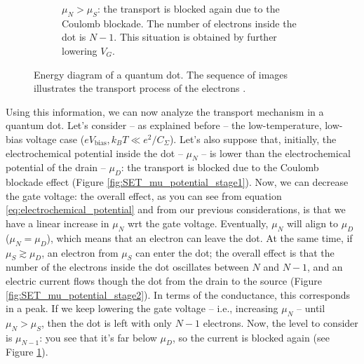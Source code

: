 \documentclass[a4paper,twoside,11pt]{book}
\begin{document}
\begin{figure}
\begin{subfigure}[t]{0.45\textwidth}
		\caption{$\mu_N>\mu_S$: the transport is blocked again due to the Coulomb blockade. The number of electrons inside the dot is $N-1$. This situation is obtained by further lowering $V_G$.}
		\label{fig:SET_mu_potential_stage3}
		\end{subfigure}
	\caption{Energy diagram of a quantum dot. The sequence of images illustrates the transport process of the electrons \citep[adapted from][]{Fasth2007}.}
	\label{fig:SET_mu_potential}
\end{figure}

Using this information, we can now analyze the transport mechanism in a quantum dot. Let's consider -- as explained before -- the low-temperature, low-bias voltage case ($eV_{\text{bias}},k_BT \ll e^2/C_{\Sigma}$). Let's also suppose that, initially, the electrochemical potential inside the dot -- $\mu_N$ -- is lower than the electrochemical potential of the drain -- $\mu_D$: the transport is blocked due to the Coulomb blockade effect (Figure \ref{fig:SET_mu_potential_stage1}). Now, we can decrease the gate voltage: the overall effect, as you can see from equation \eqref{eq:electrochemical_potential} and from our previous considerations, is that we have a linear increase in $\mu_N$ wrt the gate voltage. Eventually, $\mu_N$ will align to $\mu_D$ ($\mu_N = \mu_D$), which means that an electron can leave the dot. At the same time, if $\mu_S \gtrsim \mu_D$, an electron from $\mu_S$ can enter the dot; the overall effect is that the number of the electrons inside the dot oscillates between $N$ and $N-1$, and an electric current flows though the dot from the drain to the source (Figure \ref{fig:SET_mu_potential_stage2}). In terms of the conductance, this corresponds in a peak. If we keep lowering the gate voltage -- i.e., increasing $\mu_N$ -- until $\mu_N > \mu_S$, then the dot is left with only $N-1$ electrons. Now, the level to consider is $\mu_{N-1}$: you see that it's far below $\mu_D$, so the current is blocked again (see Figure \ref{fig:SET_mu_potential_stage3}).
\end{document}
